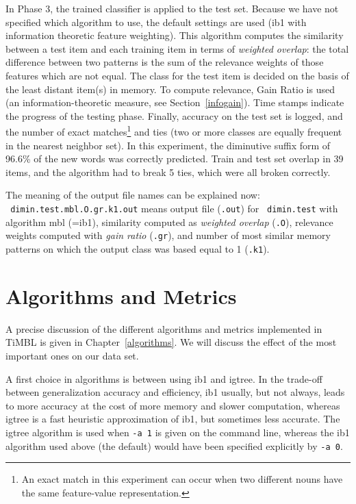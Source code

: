 \documentclass{report}
\begin{document}
In Phase 3, the trained classifier is applied to the test set. Because
we have not specified which algorithm to use, the default settings are
used ({\sc ib1} with information theoretic feature weighting). This
algorithm computes the similarity between a test item and each
training item in terms of {\em weighted overlap}: the total difference
between two patterns is the sum of the relevance weights of those
features which are not equal. The class for the test item is decided
on the basis of the least distant item(s) in memory. To compute
relevance, Gain Ratio is used (an information-theoretic measure, see
Section~\ref{infogain}). Time stamps indicate the progress of the
testing phase. Finally, accuracy on the test set is logged, and the
number of exact matches\footnote{An exact match in this experiment can
occur when two different nouns have the same feature-value
representation.} and ties (two or more classes are equally frequent in
the nearest neighbor set). In this experiment, the diminutive suffix
form of 96.6\% of the new words was correctly predicted. Train and
test set overlap in 39 items, and the algorithm had to break 5 ties,
which were all broken correctly.

The meaning of the output file names can be explained now:\\ {\tt
dimin.test.mbl.O.gr.k1.out} means output file ({\tt .out}) for {\tt
dimin.test} with algorithm {\sc mbl} (={\sc ib1}), similarity computed
as {\em weighted overlap} ({\tt .O}), relevance weights computed with
{\em gain ratio} ({\tt .gr}), and number of most similar memory
patterns on which the output class was based equal to 1 ({\tt .k1}).

\section{Algorithms and Metrics}

A precise discussion of the different algorithms and metrics
implemented in TiMBL is given in Chapter~\ref{algorithms}. We will
discuss the effect of the most important ones on our data set.

A first choice in algorithms is between using {\sc ib1} and {\sc
igtree}. In the trade-off between generalization accuracy and
efficiency, {\sc ib1} usually, but not always, leads to more accuracy
at the cost of more memory and slower computation, whereas {\sc
igtree} is a fast heuristic approximation of {\sc ib1}, but sometimes
less accurate. The {\sc igtree} algorithm is used when {\tt -a 1} is
given on the command line, whereas the {\sc ib1} algorithm used above
(the default) would have been specified explicitly by {\tt -a 0}. 
\end{document}
